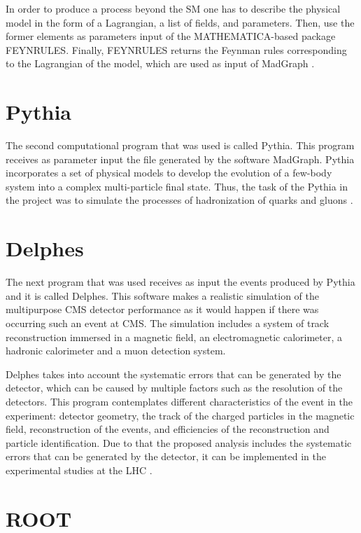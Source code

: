 In order to produce a process beyond the SM one has to describe the physical model in the form of a Lagrangian, a list of fields, and parameters. Then, use the former elements as parameters
input of the MATHEMATICA-based package FEYNRULES. Finally, FEYNRULES returns the Feynman rules corresponding to the Lagrangian of the model, which are used as input of MadGraph \cite{MadGraph 2}.


\section{Pythia}

The second computational program that was used is called Pythia. This program receives as parameter input the file generated by the software MadGraph. Pythia incorporates a set of physical models 
to develop the evolution of a few-body system into a complex multi-particle final state. Thus, the task of the Pythia in the project was to simulate the processes of hadronization of quarks and 
gluons \cite{Pythia}.


\section{Delphes}

The next program that was used receives as input the events produced by Pythia and it is called Delphes. This software makes a realistic simulation of the multipurpose CMS detector performance as 
it would happen if there was occurring such an event at CMS. The simulation includes a system of track reconstruction immersed in a magnetic field, an electromagnetic calorimeter, a hadronic 
calorimeter and a muon detection system.

Delphes takes into account the systematic errors that can be generated by the detector, which can be caused by multiple factors such as the resolution of the detectors. This program contemplates
different characteristics of the event in the experiment: detector geometry, the track of the charged particles in the magnetic field, reconstruction of the events, and efficiencies of the
reconstruction and particle identification. Due to that the proposed analysis includes the systematic errors that can be generated by the detector, it can be implemented in the experimental studies
at the LHC \cite{Delphes}. 

\section{ROOT}

